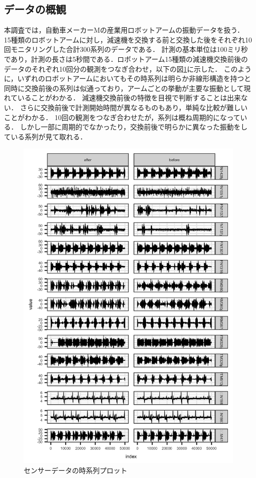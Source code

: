 \documentclass{jarticle}
\begin{document}
\subsection{データの概観}
本調査では，自動車メーカーMの産業用ロボットアームの振動データを扱う．
15種類のロボットアームに対し，減速機を交換する前と交換した後をそれぞれ10回モニタリングした合計300系列のデータである．
計測の基本単位は100ミリ秒であり，計測の長さは5秒間である．ロボットアーム15種類の減速機交換前後のデータのそれぞれ10回分の観測をつなぎ合わせ，以下の図\ref{fig:ts}に示した．
このように，いずれのロボットアームにおいてもその時系列は明らか非線形構造を持つと同時に交換前後の系列は似通っており，アームごとの挙動が主要な振動として現れていることがわかる．
減速機交換前後の特徴を目視で判断することは出来ない．
さらに交換前後で計測開始時間が異なるものもあり，単純な比較が難しいことがわかる．
10回の観測をつなぎ合わせたが，系列は概ね周期的になっている．
しかし一部に周期的でなかったり，交換前後で明らかに異なった振動をしている系列が見て取れる．
\begin{figure}[htbp]
\begin{center}
	\includegraphics[width=12cm]{fig/ts.png}	
	\caption{センサーデータの時系列プロット\label{fig:ts}}
\end{center}
\end{figure}
\end{document}

